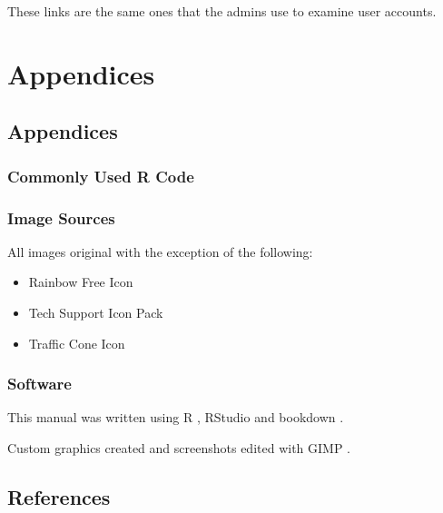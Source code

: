 \documentclass[]{book}
\providecommand{\tightlist}{%
  \setlength{\itemsep}{0pt}\setlength{\parskip}{0pt}}
\begin{document}
These links are the same ones that the admins use to examine user accounts.

\hypertarget{appendices}{%
\chapter*{Appendices}\label{appendices}}

\hypertarget{appendices-1}{%
\section*{Appendices}\label{appendices-1}}

\hypertarget{commoncode}{%
\subsection*{Commonly Used R Code}\label{commoncode}}

\hypertarget{image-sources}{%
\subsection{Image Sources}\label{image-sources}}

All images original with the exception of the following:

\begin{itemize}
\tightlist
\item
  Rainbow Free Icon \citep{rainbow}
\item
  Tech Support Icon Pack \citep{techpack}
\item
  Traffic Cone Icon \citep{cone}
\end{itemize}

\hypertarget{software}{%
\subsection*{Software}\label{software}}

This manual was written using R \citep{baser}, RStudio \citep{rstudio} and bookdown \citep{xie2015}.

Custom graphics created and screenshots edited with GIMP \citep{gimp}.

\hypertarget{references}{%
\section*{References}\label{references}}


\end{document}
